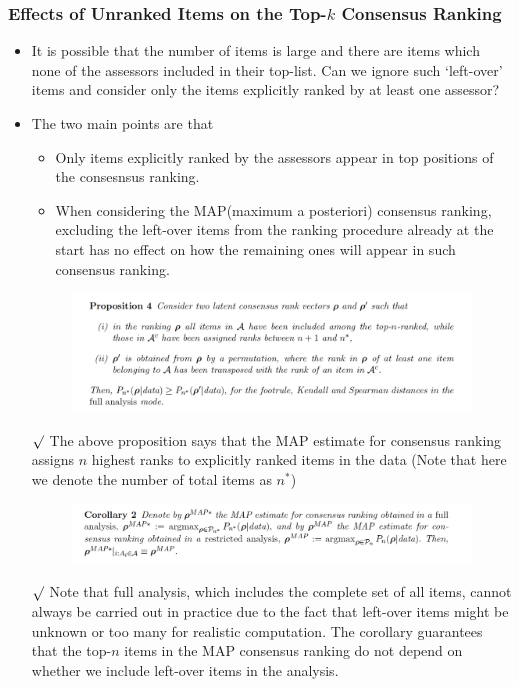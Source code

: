 \documentclass[12pt]{article}
\newcommand{\rmk}{$\surd$}
\begin{document}
\subsubsection{Effects of Unranked Items on the Top-$k$ Consensus Ranking}
\begin{itemize}
    \item It is possible that the number of items is large and  there are items which none of the assessors included in their top-list. Can we ignore such `left-over' items and consider only the items explicitly ranked by at least one assessor?
    \item The two main points are that
    \begin{itemize}
        \item Only items explicitly ranked by the assessors appear in top positions of the consesnsus ranking.
        \item When considering the MAP(maximum a posteriori) consensus ranking, excluding the left-over items from the ranking procedure already at the start has no effect on how the remaining ones will appear in such consensus ranking.
    \end{itemize}
    \begin{figure}[h]
        \includegraphics[width=\textwidth]{Proposition4.png}
        \centering
    \end{figure}
    \item[\rmk] The above proposition says that the MAP estimate for consensus ranking assigns $n$ highest ranks to explicitly ranked items in the data (Note that here we denote the number of total items as $n^*$)
    \begin{figure}[h]
        \includegraphics[width=\textwidth]{Corollary2.png}
        \centering
    \end{figure}
    \item[\rmk] Note that full analysis, which includes the complete set of all  items, cannot always be carried out in practice due to the fact that left-over items might be unknown or too many for realistic computation. The corollary guarantees that the top-$n$ items in the MAP consensus ranking do not depend on whether we include left-over items in the analysis. 
\end{itemize}
\end{document}
